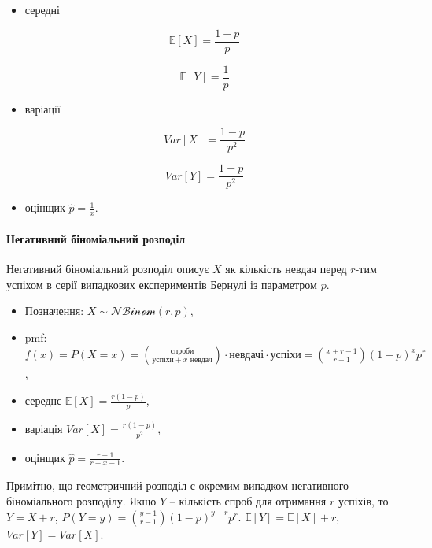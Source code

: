 \documentclass[
  11pt,
]{book}
\providecommand{\tightlist}{%
  \setlength{\itemsep}{0pt}\setlength{\parskip}{0pt}}
\begin{document}
\begin{itemize}
\tightlist
\item
  середні
\end{itemize}

\[\mathbb{E} [X] = \frac{1-p}{p}\]

\[\mathbb{E} [Y] = \frac{1}{p}\]

\begin{itemize}
\tightlist
\item
  варіації
\end{itemize}

\[Var[X] = \frac{1-p}{p^2}\]

\[Var[Y] = \frac{1-p}{p^2}\]

\begin{itemize}
\tightlist
\item
  оцінщик \(\hat{p} = \frac{1}{x}\).
\end{itemize}

\paragraph{Негативний біноміальний розподіл}\label{ux43dux435ux433ux430ux442ux438ux432ux43dux438ux439-ux431ux456ux43dux43eux43cux456ux430ux43bux44cux43dux438ux439-ux440ux43eux437ux43fux43eux434ux456ux43b}

Негативний біноміальний розподіл описує \(X\) як кількість невдач перед \(r\)-тим успіхом в серії випадкових експериментів Бернулі із параметром \(p\).

\begin{itemize}
\item
  Позначення: \(X \sim \mathcal{NBinom} (r, p)\),
\item
  pmf: \(f(x) = P(X = x) = \binom{\text{спроби}}{\text{успіхи} + x \text{ невдач}} \cdot \text{невдачі} \cdot \text{успіхи} = \binom{x + r - 1}{r-1} (1-p) ^x p^r\),
\item
  середнє \(\mathbb{E} [X] = \frac{r(1-p)}{p}\),
\item
  варіація \(Var[X] = \frac{r(1-p)}{p^2}\),
\item
  оцінщик \(\hat{p} = \frac{r-1}{r + x - 1}\).
\end{itemize}

Примітно, що геометричний розподіл є окремим випадком негативного біноміального розподілу. Якщо \(Y\) -- кількість спроб для отримання \(r\) успіхів, то \(Y = X + r\), \(P(Y = y) = \binom{y-1}{r-1} (1-p)^{y-r} p^r\). \(\mathbb{E}[Y] = \mathbb{E}[X] + r\), \(Var[Y] = Var[X]\).
\end{document}
